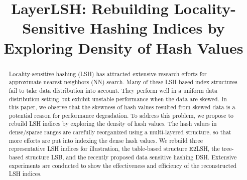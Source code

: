 \documentclass[sigconf]{acmart}
\begin{document}
\newcommand{\Paragraph}[1]{\smallskip{\bf #1.}}
\newcommand{\Paragraphnopunc}[1]{\smallskip\noindent{\bf #1}}
\newcommand{\Paragraphwithindent}[1]{\smallskip{\bf #1.}}
\newcommand{\tabincell}[2]{\begin{tabular}{@{}#1@{}}#2\end{tabular}}
\newcommand{\argmin}{\text{arg}\,\text{min}}
\newcommand{\argmax}{\text{arg}\,\text{max}}

\newtheorem{prop}{Proposition}


\title{LayerLSH: Rebuilding Locality-Sensitive Hashing Indices by Exploring Density of Hash Values}



\begin{abstract}
Locality-sensitive hashing (LSH) has attracted extensive research efforts for approximate nearest neighbors (NN) search. Many of these LSH-based index structures fail to take data distribution into account. They perform well in a uniform data distribution setting but exhibit unstable performance when the data are skewed. In this paper, we observe that the skewness of hash values resulted from skewed data is a potential reason for performance degradation. To address this problem, we propose to rebuild LSH indices by exploring the density of hash values. The hash values in dense/sparse ranges are carefully reorganized using a multi-layered structure, so that more efforts are put into indexing the dense hash values. We rebuild three representative LSH indices for illustration, the table-based structure E2LSH, the tree-based structure LSB, and the recently proposed data sensitive hashing DSH. Extensive experiments are conducted to show the effectiveness and efficiency of the reconstructed LSH indices.
\end{abstract}



\maketitle





%

%








%
\end{document}
